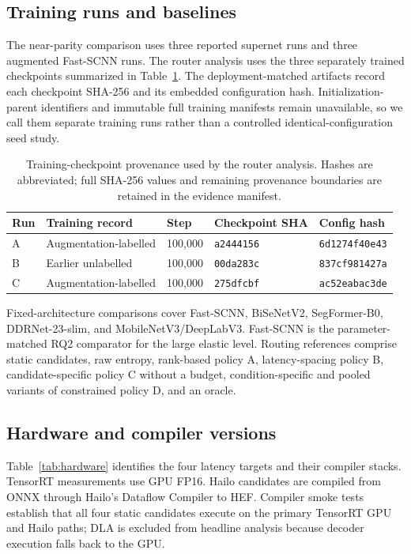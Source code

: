\documentclass[a4paper,review,12pt]{elsarticle}
\begin{document}
\subsection{Training runs and baselines}

The near-parity comparison uses three reported supernet runs and three augmented Fast-SCNN runs. The router analysis uses the three separately trained checkpoints summarized in Table~\ref{tab:provenance}. The deployment-matched artifacts record each checkpoint SHA-256 and its embedded configuration hash. Initialization-parent identifiers and immutable full training manifests remain unavailable, so we call them separate training runs rather than a controlled identical-configuration seed study.

\begin{table}[H]
\centering
\caption{Training-checkpoint provenance used by the router analysis. Hashes are abbreviated; full SHA-256 values and remaining provenance boundaries are retained in the evidence manifest.}
\label{tab:provenance}
\small
\begin{tabularx}{\textwidth}{@{}lXlll@{}}
\toprule
Run & Training record & Step & Checkpoint SHA & Config hash \\
\midrule
A & Augmentation-labelled & 100,000 & \texttt{a2444156} & \texttt{6d1274f40e43} \\
B & Earlier unlabelled & 100,000 & \texttt{00da283c} & \texttt{837cf981427a} \\
C & Augmentation-labelled & 100,000 & \texttt{275dfcbf} & \texttt{ac52eabac3de} \\
\bottomrule
\end{tabularx}
\end{table}

Fixed-architecture comparisons cover Fast-SCNN, BiSeNetV2, SegFormer-B0, DDRNet-23-slim, and MobileNetV3/DeepLabV3. Fast-SCNN is the parameter-matched RQ2 comparator for the large elastic level. Routing references comprise static candidates, raw entropy, rank-based policy A, latency-spacing policy B, candidate-specific policy C without a budget, condition-specific and pooled variants of constrained policy D, and an oracle.

\subsection{Hardware and compiler versions}

Table~\ref{tab:hardware} identifies the four latency targets and their compiler stacks. TensorRT measurements use GPU FP16. Hailo candidates are compiled from ONNX through Hailo's Dataflow Compiler to HEF. Compiler smoke tests establish that all four static candidates execute on the primary TensorRT GPU and Hailo paths; DLA is excluded from headline analysis because decoder execution falls back to the GPU.
\end{document}
